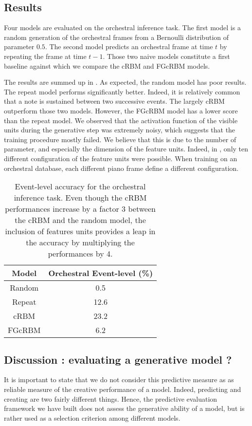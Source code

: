 \documentclass[letterpaper]{article}
\begin{document}
\subsection{Results}
Four models are evaluated on the orchestral inference task. The first model is a random generation of the orchestral frames from a Bernoulli distribution of parameter $0.5$. The second model predicts an orchestral frame at time $t$ by repeating the frame at time $t-1$. Those two naive models constitute a first baseline against which we compare the cRBM and FGcRBM models.

The results are summed up in . As expected, the random model has poor results. The repeat model performs significantly better. Indeed, it is relatively common that a note is sustained between two successive events. The largely cRBM outperform those two models. However, the FGcRBM model has a lower score than the repeat model. We observed that the activation function of the visible units during the generative step was extremely noisy, which suggests that the training procedure mostly failed. We believe that this is due to the number of parameter,  and especially the dimension of the feature units. Indeed, in \cite{taylor2009factored}, only ten different configuration of the feature units were possible. When training on an orchestral database,  each different piano frame define a different configuration.

\begin{table}[h]
\centering
\begin{tabular}{c c}
\hline
Model & Orchestral Event-level (\%)\\
\hline
Random & 0.5\\ 
Repeat & 12.6\\
\hline \hline
cRBM & 23.2\\ 
FGcRBM & 6.2\\ 
\end{tabular}
\caption{Event-level accuracy for the orchestral inference task. Even though the cRBM performances increase by a factor 3 between the cRBM and the random model, the inclusion of features units provides a leap in the accuracy by multiplying the performances by 4.}
\label{tab:result_event_level}
\end{table}

\subsection{Discussion : evaluating a generative model ?}
It is important to state that we do not consider this predictive measure as as reliable measure of the creative performance of a model. Indeed, predicting and creating are two fairly different things. 
Hence, the predictive evaluation framework we have built does not assess the generative ability of a model, but is rather used as a selection criterion among different models.
\end{document}
